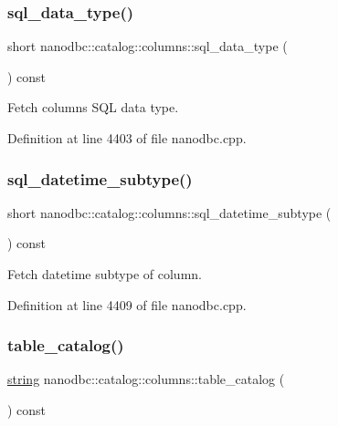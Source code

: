 \subsubsection{\texorpdfstring{sql\_data\_type()}{sql\_data\_type()}}
{\footnotesize\ttfamily short nanodbc\+::catalog\+::columns\+::sql\+\_\+data\+\_\+type (\begin{DoxyParamCaption}{ }\end{DoxyParamCaption}) const}



Fetch column\textquotesingle{}s S\+QL data type. 



Definition at line 4403 of file nanodbc.\+cpp.

\mbox{\label{classnanodbc_1_1catalog_1_1columns_a80c8ad5ce70a610f31e93dbfdbdda962}} 
\subsubsection{\texorpdfstring{sql\_datetime\_subtype()}{sql\_datetime\_subtype()}}
{\footnotesize\ttfamily short nanodbc\+::catalog\+::columns\+::sql\+\_\+datetime\+\_\+subtype (\begin{DoxyParamCaption}{ }\end{DoxyParamCaption}) const}



Fetch datetime subtype of column. 



Definition at line 4409 of file nanodbc.\+cpp.

\mbox{\label{classnanodbc_1_1catalog_1_1columns_a21b22abe9b7ac3cec9d6ddbd25b56a3f}} 
\subsubsection{\texorpdfstring{table\_catalog()}{table\_catalog()}}
{\footnotesize\ttfamily \mbox{\hyperlink{namespacenanodbc_abfc0ece56278e590911ec8352774c212}{string}} nanodbc\+::catalog\+::columns\+::table\+\_\+catalog (\begin{DoxyParamCaption}{ }\end{DoxyParamCaption}) const}



